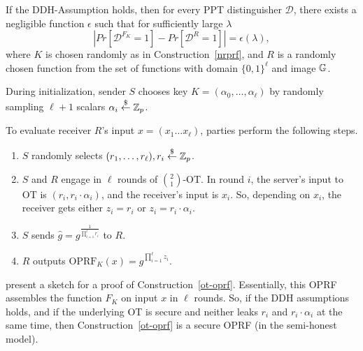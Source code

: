 \begin{theorem}
\label{theorem:naor}
If the DDH-Assumption holds, then for every PPT distinguisher
$\mathcal{D}$, there exists a negligible function $\epsilon$ such that for
    sufficiently large $\lambda$
$$| Pr[\mathcal{D}^{F_K}=1] - Pr[\mathcal{D}^{R} = 1]|
    =\epsilon(\lambda), $$ where $K$ is chosen randomly as in
    Construction~\ref{nrprf}, and $R$ is a randomly chosen function
    from the set of functions with domain $\{0,1\}^\ell$ and image
    $\mathbb{G}$.

\end{theorem}

\begin{construction}
\label{ot-oprf}
  During initialization, sender $S$ chooses key
  $K=(\alpha_0,\ldots,\alpha_\ell)$ by randomly sampling $\ell+1$
  scalars $\alpha_i\stackrel{\$}{\leftarrow}\mathbb{Z}_p$.

  To evaluate receiver $R$'s input $x=(x_1\ldots{}x_\ell)$, parties perform the following steps.
  \begin{enumerate}
  \item $S$ randomly selects $(r_1,\ldots,r_\ell),r_i\stackrel{\$}{\leftarrow}\mathbb{Z}_p$.
  \item $S$ and $R$ engage in $\ell$ rounds of $\binom{2}{1}$-OT. In round
    $i$, the server's input to OT is $(r_i,r_i\cdot\alpha_i)$, and the
    receiver's input is $x_i$. So, depending on $x_i$, the receiver gets either $z_i=r_i$ or $z_i=r_i\cdot{}\alpha_i$.
  \item $S$ sends $\hat{g}=g^{\frac{1}{\prod_{i=1}^{\ell}r_i}}$ to $R$.
    \item $R$ outputs $\text{OPRF}_K(x)=\hat{g}^{\prod^{\ell}_{i=1}z_i}$.
    
    \end{enumerate}
\end{construction}

\citet{oprf} present a sketch for a proof of
Construction~\ref{ot-oprf}. Essentially, this OPRF assembles the
\citeauthor{prf} function $F_K$ on input $x$ in $\ell$ rounds.  So, if
the DDH assumptions holds, and if the underlying OT is secure and
neither leaks $r_i$ and $r_i\cdot\alpha_i$ at the same time, then
Construction~\ref{ot-oprf} is a secure OPRF (in the semi-honest
model).

